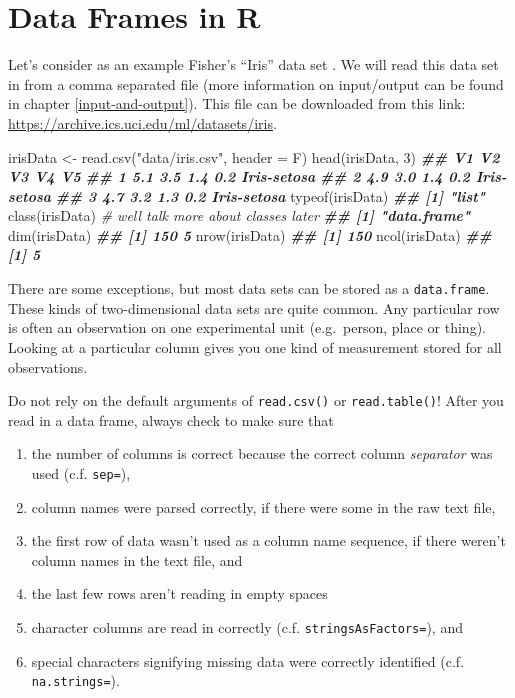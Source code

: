 \documentclass[
  12pt,
]{krantz}
\makeatletter
\newenvironment{Shaded}{\begin{snugshade}}{\end{snugshade}}
\newcommand{\AttributeTok}[1]{\textcolor[rgb]{0.61,0.61,0.61}{#1}}
\newcommand{\CommentTok}[1]{\textcolor[rgb]{0.37,0.37,0.37}{\textit{#1}}}
\newcommand{\DecValTok}[1]{\textcolor[rgb]{0.06,0.06,0.06}{#1}}
\newcommand{\DocumentationTok}[1]{\textcolor[rgb]{0.37,0.37,0.37}{\textbf{\textit{#1}}}}
\newcommand{\FunctionTok}[1]{\textcolor[rgb]{0,0,0}{#1}}
\newcommand{\NormalTok}[1]{#1}
\newcommand{\OtherTok}[1]{\textcolor[rgb]{0.37,0.37,0.37}{#1}}
\newcommand{\StringTok}[1]{\textcolor[rgb]{0.5,0.5,0.5}{#1}}
\providecommand{\tightlist}{%
  \setlength{\itemsep}{0pt}\setlength{\parskip}{0pt}}
\newenvironment{kframe}{%
\medskip{}
\setlength{\fboxsep}{.8em}
 \def\at@end@of@kframe{}%
 \ifinner\ifhmode%
  \def\at@end@of@kframe{\end{minipage}}%
  \begin{minipage}{\columnwidth}%
 \fi\fi%
 \def\FrameCommand##1{\hskip\@totalleftmargin \hskip-\fboxsep
 \colorbox{shadecolor}{##1}\hskip-\fboxsep
     \hskip-\linewidth \hskip-\@totalleftmargin \hskip\columnwidth}%
 \MakeFramed {\advance\hsize-\width
   \@totalleftmargin\z@ \linewidth\hsize
   \@setminipage}}%
 {\par\unskip\endMakeFramed%
 \at@end@of@kframe}
\renewenvironment{Shaded}{\begin{kframe}}{\end{kframe}}
\makeatother
\begin{document}
\hypertarget{data-frames-in-r}{%
\section{Data Frames in R}\label{data-frames-in-r}}

Let's consider as an example Fisher's ``Iris'' data set \citep{misc_iris_53}. We will read this data set in from a comma separated file (more information on input/output can be found in chapter \ref{input-and-output}). This file can be downloaded from this link: \url{https://archive.ics.uci.edu/ml/datasets/iris}.

\begin{Shaded}
\begin{Highlighting}[]
\NormalTok{irisData }\OtherTok{\textless{}{-}} \FunctionTok{read.csv}\NormalTok{(}\StringTok{"data/iris.csv"}\NormalTok{, }\AttributeTok{header =}\NormalTok{ F)}
\FunctionTok{head}\NormalTok{(irisData, }\DecValTok{3}\NormalTok{)}
\DocumentationTok{\#\#    V1  V2  V3  V4          V5}
\DocumentationTok{\#\# 1 5.1 3.5 1.4 0.2 Iris{-}setosa}
\DocumentationTok{\#\# 2 4.9 3.0 1.4 0.2 Iris{-}setosa}
\DocumentationTok{\#\# 3 4.7 3.2 1.3 0.2 Iris{-}setosa}
\FunctionTok{typeof}\NormalTok{(irisData)}
\DocumentationTok{\#\# [1] "list"}
\FunctionTok{class}\NormalTok{(irisData) }\CommentTok{\# we\textquotesingle{}ll talk more about classes later}
\DocumentationTok{\#\# [1] "data.frame"}
\FunctionTok{dim}\NormalTok{(irisData)}
\DocumentationTok{\#\# [1] 150   5}
\FunctionTok{nrow}\NormalTok{(irisData)}
\DocumentationTok{\#\# [1] 150}
\FunctionTok{ncol}\NormalTok{(irisData)}
\DocumentationTok{\#\# [1] 5}
\end{Highlighting}
\end{Shaded}

There are some exceptions, but most data sets can be stored as a \texttt{data.frame}. These kinds of two-dimensional data sets are quite common. Any particular row is often an observation on one experimental unit (e.g.~person, place or thing). Looking at a particular column gives you one kind of measurement stored for all observations.

Do not rely on the default arguments of \texttt{read.csv()} or \texttt{read.table()}! After you read in a data frame, always check to make sure that

\begin{enumerate}
\def\labelenumi{\arabic{enumi}.}
\tightlist
\item
  the number of columns is correct because the correct column \emph{separator} was used (c.f. \texttt{sep=}),
\item
  column names were parsed correctly, if there were some in the raw text file,
\item
  the first row of data wasn't used as a column name sequence, if there weren't column names in the text file, and
\item
  the last few rows aren't reading in empty spaces
\item
  character columns are read in correctly (c.f. \texttt{stringsAsFactors=}), and
\item
  special characters signifying missing data were correctly identified (c.f. \texttt{na.strings=}).
\end{enumerate}
\end{document}
